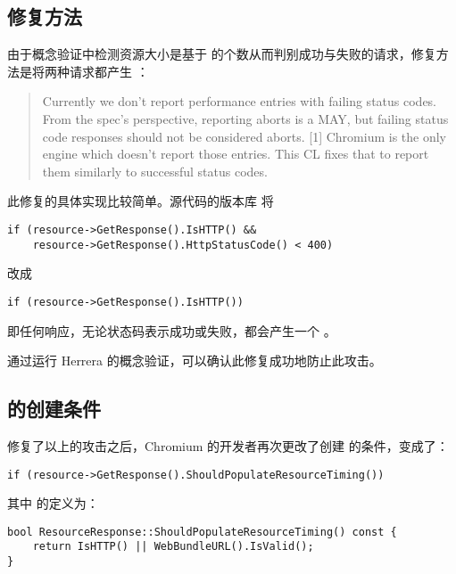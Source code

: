\subsection{修复方法}

由于概念验证中检测资源大小是基于 的个数从而判别成功与失败的请求，修复方法是将两种请求都产生  \cite{fix}：

\begin{quote}
    Currently we don't report performance entries with failing status codes.
    From the spec's perspective, reporting aborts is a MAY, but failing
    status code responses should not be considered aborts. [1]
    Chromium is the only engine which doesn't report those entries.
    This CL fixes that to report them similarly to successful status codes.
\end{quote}

\newpage

此修复的具体实现比较简单。源代码的版本库 \cite{fixcode} 将

\begin{lstlisting}
if (resource->GetResponse().IsHTTP() &&
    resource->GetResponse().HttpStatusCode() < 400)
\end{lstlisting}

改成 

\begin{lstlisting}
if (resource->GetResponse().IsHTTP())
\end{lstlisting}

即任何响应，无论状态码表示成功或失败，都会产生一个 。

通过运行 Herrera 的概念验证，可以确认此修复成功地防止此攻击。

\subsection{ 的创建条件}

修复了以上的攻击之后，Chromium 的开发者再次更改了创建  的条件，变成了：

\begin{lstlisting}
if (resource->GetResponse().ShouldPopulateResourceTiming())
\end{lstlisting}

其中  的定义为：

\begin{lstlisting}
bool ResourceResponse::ShouldPopulateResourceTiming() const {
    return IsHTTP() || WebBundleURL().IsValid();
}
\end{lstlisting}
    
